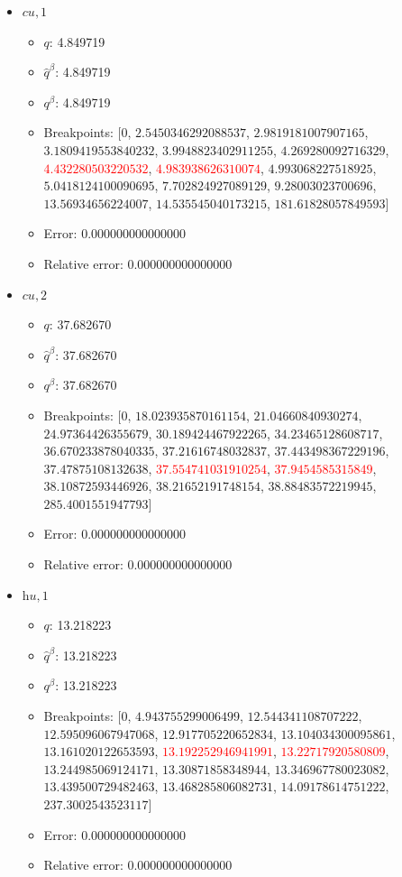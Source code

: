 \documentclass{article}%
\begin{document}
\begin{itemize}
\begin{itemize}
		\item Error: 0.000000000000000%
		\item Relative error: 0.000000000000000%
	\end{itemize}%
	\item $\textit{cu},1$%
	\begin{itemize}%
		\item $q$: 4.849719%
		\item $\hat{q}^\beta$: 4.849719%
		\item $q^\beta$: 4.849719%
		\item Breakpoints: $[$$0$, $2.5450346292088537$, $2.9819181007907165$, $3.1809419553840232$, $3.9948823402911255$, $4.269280092716329$, \textcolor{red}{$4.432280503220532$}, \textcolor{red}{$4.983938626310074$}, $4.993068227518925$, $5.0418124100090695$, $7.702824927089129$, $9.28003023700696$, $13.56934656224007$, $14.535545040173215$, $181.61828057849593$$]$%
		\item Error: 0.000000000000000%
		\item Relative error: 0.000000000000000%
	\end{itemize}%
	\item $\textit{cu},2$%
	\begin{itemize}%
		\item $q$: 37.682670%
		\item $\hat{q}^\beta$: 37.682670%
		\item $q^\beta$: 37.682670%
		\item Breakpoints: $[$$0$, $18.023935870161154$, $21.04660840930274$, $24.97364426355679$, $30.189424467922265$, $34.23465128608717$, $36.670233878040335$, $37.21616748032837$, $37.443498367229196$, $37.47875108132638$, \textcolor{red}{$37.554741031910254$}, \textcolor{red}{$37.9454585315849$}, $38.10872593446926$, $38.21652191748154$, $38.88483572219945$, $285.4001551947793$$]$%
		\item Error: 0.000000000000000%
		\item Relative error: 0.000000000000000%
	\end{itemize}%
	\item $\textit{hu},1$%
	\begin{itemize}%
		\item $q$: 13.218223%
		\item $\hat{q}^\beta$: 13.218223%
		\item $q^\beta$: 13.218223%
		\item Breakpoints: $[$$0$, $4.943755299006499$, $12.544341108707222$, $12.595096067947068$, $12.917705220652834$, $13.104034300095861$, $13.161020122653593$, \textcolor{red}{$13.192252946941991$}, \textcolor{red}{$13.22717920580809$}, $13.244985069124171$, $13.30871858348944$, $13.346967780023082$, $13.439500729482463$, $13.468285806082731$, $14.09178614751222$, $237.3002543523117$$]$%
		\item Error: 0.000000000000000%
		\item Relative error: 0.000000000000000%
	\end{itemize}%
\end{itemize}%
\end{document}
